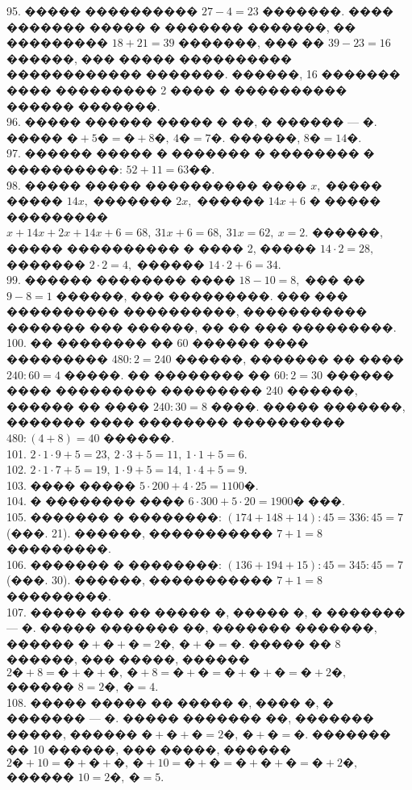 \documentclass[12pt]{article}
\begin{document}
95. ����� ���������� $27-4=23$ �������. ���� ������� ����� � ������� �������, �� ��������� $18+21=39$ �������, ��� �� $39-23=16$ ������, ��� ����� ���������� ������������ �������. ������, 16 ������� ���� ��������� 2 ���� � ���������� ������ �������.\\
96. ����� ������ ����� � ��, � ������ --- �. ����� $\text{�}+5\text{�}=\text{�}+8\text{�},\ 4\text{�}=7\text{�}.$ ������, $8\text{�}=14\text{�}.$\\
97. ������ ����� � ������� � �������� � ����������: $52+11=63$��.\\
98. ����� ����� ���������� ���� $x,$ ����� ����� $14x,$ ������� $2x,$ ������ $14x+6$ � ����� ��������� $x+14x+2x+14x+6=68,\ 31x+6=68,\ 31x=62,\ x=2.$ ������, ����� ���������� � ���� 2, ����� $14\cdot2=28,$ ������� $2\cdot2=4,$ ������ $14\cdot2+6=34.$\\
99. ������ �������� ���� $18-10=8,$ ��� �� $9-8=1$ ������, ��� ���������. ��� ��� ���������� ����������, ����������� ������� ��� ������, �� �� ��� ���������.\\
100. �� �������� �� 60 ������ ���� ��������� $480:2=240$ ������, ������� �� ���� $240:60=4$ �����. �� �������� �� $60:2=30$ ������ ���� ��������� ��������� 240 ������, ������ �� ���� $240:30=8$ ����. ����� �������, ������� ���� �������� ���������� $480:(4+8)=40$ ������.\\
101. $2\cdot1\cdot9+5=23,\ 2\cdot3+5=11,\ 1\cdot1+5=6.$\\
102. $2\cdot1\cdot7+5=19,\ 1\cdot9+5=14,\ 1\cdot4+5=9.$\\
103. ���� ����� $5\cdot200+4\cdot25=1100$�.\\
104. � �������� ���� $6\cdot300+5\cdot20=1900$� ���.\\
105. ������� � ��������: $(174+148+14):45=336:45=7$(���. 21). ������, ����������� $7+1=8$ ���������.\\
106. ������� � ��������: $(136+194+15):45=345:45=7$(���. 30). ������, ����������� $7+1=8$ ���������.\\
107. ����� ��� �� ����� �, ����� �, � ������� --- �. ����� ������� ��, ������� �������, ������ $\text{�}+\text{�}+\text{�}=2\text{�},\ \text{�}+\text{�}=\text{�}.$ ����� �� 8 ������, ��� �����, ������ $2\text{�}+8=\text{�}+\text{�}+\text{�},\ \text{�}+8=\text{�}+\text{�}=\text{�}+\text{�}+\text{�}=\text{�}+2\text{�},$ ������ $8=2\text{�},\ \text{�}=4.$\\
108. ����� ����� �� ����� �, ���� �, � ������� --- �. ����� ������� ��, ������� �����, ������ $\text{�}+\text{�}+\text{�}=2\text{�},\ \text{�}+\text{�}=\text{�}.$ ������� �� 10 ������, ��� �����, ������ $2\text{�}+10=\text{�}+\text{�}+\text{�},\ \text{�}+10=\text{�}+\text{�}=\text{�}+\text{�}+\text{�}=\text{�}+2\text{�},$ ������ $10=2\text{�},\ \text{�}=5.$\\
\end{document}
